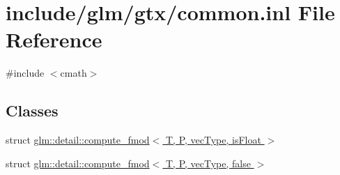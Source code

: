 \hypertarget{common_8inl}{}\section{include/glm/gtx/common.inl File Reference}
\label{common_8inl}
{\ttfamily \#include $<$cmath$>$}\newline
\subsection*{Classes}
\begin{DoxyCompactItemize}
\item 
struct \hyperlink{structglm_1_1detail_1_1compute__fmod}{glm\+::detail\+::compute\+\_\+fmod$<$ T, P, vec\+Type, is\+Float $>$}
\item 
struct \hyperlink{structglm_1_1detail_1_1compute__fmod_3_01T_00_01P_00_01vecType_00_01false_01_4}{glm\+::detail\+::compute\+\_\+fmod$<$ T, P, vec\+Type, false $>$}
\end{DoxyCompactItemize}
